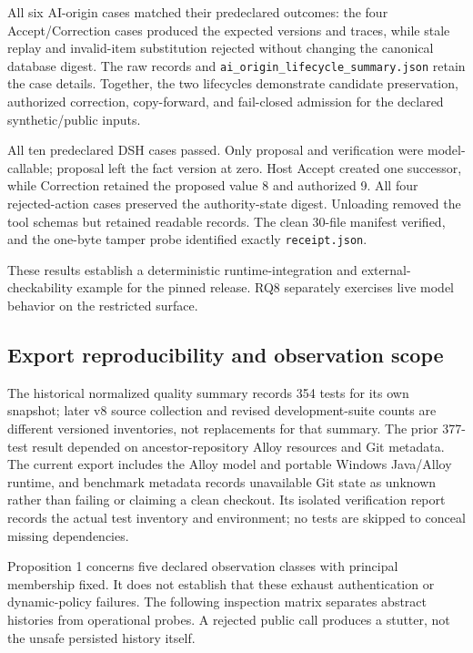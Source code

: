 \documentclass[preprint,12pt,authoryear]{elsarticle}
\newcommand{\code}[1]{\nolinkurl{#1}}
\begin{document}
All six AI-origin cases matched their predeclared outcomes: the four Accept/Correction cases produced the expected versions and traces, while stale replay and invalid-item substitution rejected without changing the canonical database digest. The raw records and \code{ai_origin_lifecycle_summary.json} retain the case details. Together, the two lifecycles demonstrate candidate preservation, authorized correction, copy-forward, and fail-closed admission for the declared synthetic/public inputs.

All ten predeclared DSH cases passed. Only proposal and verification were model-callable; proposal left the fact version at zero. Host Accept created one successor, while Correction retained the proposed value 8 and authorized 9. All four rejected-action cases preserved the authority-state digest. Unloading removed the tool schemas but retained readable records. The clean 30-file manifest verified, and the one-byte tamper probe identified exactly \code{receipt.json}.

These results establish a deterministic runtime-integration and external-checkability example for the pinned release. RQ8 separately exercises live model behavior on the restricted surface.

\subsection{Export reproducibility and observation scope}
\label{sec:export-reproducibility}
The historical normalized quality summary records 354 tests for its own snapshot; later v8 source collection and revised development-suite counts are different versioned inventories, not replacements for that summary. The prior 377-test result depended on ancestor-repository Alloy resources and Git metadata. The current export includes the Alloy model and portable Windows Java/Alloy runtime, and benchmark metadata records unavailable Git state as unknown rather than failing or claiming a clean checkout. Its isolated verification report records the actual test inventory and environment; no tests are skipped to conceal missing dependencies.

Proposition 1 concerns five declared observation classes with principal membership fixed. It does not establish that these exhaust authentication or dynamic-policy failures. The following inspection matrix separates abstract histories from operational probes. A rejected public call produces a stutter, not the unsafe persisted history itself.
\end{document}
